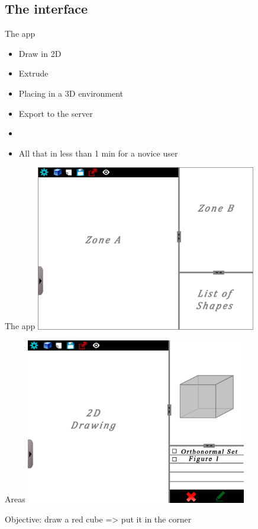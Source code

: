\documentclass[a4paper,10pt]{beamer}
\begin{document}
		\subsection{The interface}
		
		
			\begin{frame}{The app}
				\begin{itemize}
					\item Draw in 2D
					\item Extrude
					\item Placing in a 3D environment
					\item Export to the server
					
					\item  
					\item All that in less than 1 min for a novice user
				\end{itemize}
			\end{frame}
		
		
			\begin{frame}{The app}
				\includegraphics[height=205pt]{maquette/maquette_1.png}
			\end{frame}
			
			\begin{frame}{Areas}
				\includegraphics[height=205pt]{maquette/maquette_2.png}
				
				\pause
				
				Objective: draw a red cube => put it in the corner
			\end{frame}
			
\end{document}
